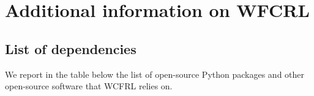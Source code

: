 \documentclass{article}
\begin{document}
\newpage


\section{Additional information on WFCRL}
\subsection{List of dependencies}\label{appendix:dependencies}

We report in the table below the list of open-source Python packages and other open-source software that WCFRL relies on.

\end{document}
